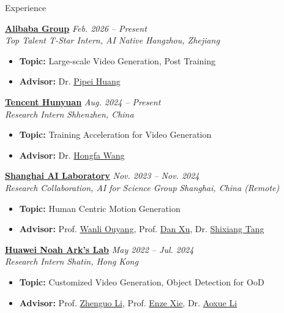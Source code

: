 \documentclass[a4paper]{resume} %
\begin{document}



\begin{rSection}{Experience}


{\bf \href{https://www.alibaba.com}{Alibaba Group}} \hfill{\it Feb. 2026 -- Present}\\
{\it Top Talent T-Star Intern, AI Native} \hfill{\it Hangzhou, Zhejiang}
\begin{itemize}
    \item {\bf Topic:} Large-scale Video Generation, Post Training
 	\item {\bf Advisor:} Dr. \href{https://scholar.google.com/citations?user=RPqpC-cAAAAJ}{Pipei Huang}
\end{itemize}


{\bf \href{https://www.tencent.com/en-us/}{Tencent Hunyuan}} \hfill{\it Aug. 2024 -- Present}\\
{\it Research Intern} \hfill{\it Shhenzhen, China}
\begin{itemize}
    \item {\bf Topic:} Training Acceleration for Video Generation
 	\item {\bf Advisor:} Dr. \href{https://scholar.google.com/citations?user=q9Fn50QAAAAJ\&hl=en\&oi=ao}{Hongfa Wang}
\end{itemize}


{\bf \href{https://www.shlab.org.cn}{Shanghai AI Laboratory}} \hfill{\it Nov. 2023 -- Nov. 2024}\\
{\it Research Collaboration, AI for Science Group} \hfill{\it Shanghai, China (Remote)}
\begin{itemize}
    \item {\bf Topic:} Human Centric Motion Generation
 	\item {\bf Advisor:} Prof. \href{https://wlouyang.github.io/}{Wanli Ouyang}, Prof. \href{https://www.danxurgb.net/}{Dan Xu}, Dr. \href{https://scholar.google.com.tw/citations?user=TJ4ihdkAAAAJ}{Shixiang Tang}
\end{itemize}


{\bf \href{http://dev3.noahlab.com.hk}{Huawei Noah Ark's Lab}} \hfill{\it May 2022 -- Jul. 2024}\\
{\it Research Intern} \hfill{\it Shatin, Hong Kong}
\begin{itemize}
    \item {\bf Topic:} Customized Video Generation, Object Detection for OoD
 	\item {\bf Advisor:} Prof. \href{https://zhenguol.github.io}{Zhenguo Li}, Prof. \href{https://xieenze.github.io}{Enze Xie}, Dr. \href{https://openreview.net/profile?id=~Aoxue\_Li2}{Aoxue Li}
\end{itemize}



\end{rSection}
\end{document}
